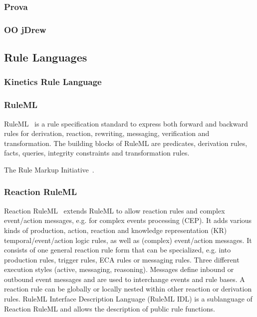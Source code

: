 \documentclass[11pt,twocolumn]{article}
\begin{document}
\subsubsection{Prova}


\subsubsection{OO jDrew}



\subsection{Rule Languages}
\subsubsection{Kinetics Rule Language}


\subsubsection{RuleML}
RuleML~\cite{2006-Boley-RuleML.pdf} is a rule specification standard to express both forward and backward rules for derivation, reaction, rewriting, messaging, verification and transformation. The building blocks of RuleML are predicates, derivation rules, facts, queries, integrity constraints and transformation rules.

The Rule Markup Initiative~\cite{wwwruleml}.


\subsubsection{Reaction RuleML}
Reaction RuleML~\cite{2012-Paschke_etal-ReactionRuleML.pdf} extends RuleML to allow reaction rules and complex event/action messages, e.g. for complex events processing (CEP). It adds various kinds of production, action, reaction and knowledge representation (KR) temporal/event/action logic rules, as well as (complex) event/action messages. It consists of one general reaction rule form that can be specialized, e.g. into production rules, trigger rules, ECA rules or messaging rules. Three different execution styles (active, messaging,  reasoning). Messages define inbound or outbound event messages and are used to interchange events and rule bases. A reaction rule can be globally or locally nested within other reaction or derivation rules.
RuleML Interface Description Language (RuleML IDL) is a sublanguage of Reaction RuleML and allows the description of public rule functions.
\end{document}
